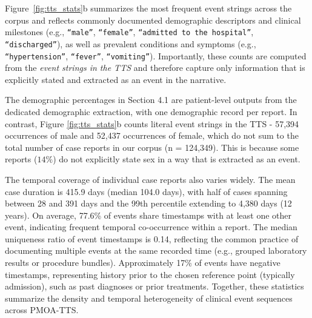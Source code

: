 \documentclass[pdflatex,sn-mathphys-num]{sn-jnl}%
\newif\ifshowrebuttalcolor
\newcommand{\rebuttal}[1]{%
  \ifshowrebuttalcolor
    \textcolor{rebuttalblue}{#1}%
  \else
    #1%
  \fi
}
\theoremstyle{thmstyleone}%
\theoremstyle{thmstyletwo}%
\theoremstyle{thmstylethree}%
\begin{document}
Figure~\ref{fig:tts_stats}b summarizes the most frequent event strings across the corpus and reflects commonly documented demographic descriptors and clinical milestones (e.g., \texttt{``male''}, \texttt{``female''}, \texttt{``admitted to the hospital''}, \texttt{``discharged''}), as well as prevalent conditions and symptoms (e.g., \texttt{``hypertension''}, \texttt{``fever''}, \texttt{``vomiting''}). 
Importantly, these counts are computed from the \emph{event strings in the TTS} and therefore capture only information that is explicitly stated and extracted as an event in the narrative. 
\rebuttal{The demographic percentages in Section 4.1 are patient-level outputs from the dedicated demographic extraction, with one demographic record per report. In contrast, Figure \ref{fig:tts_stats}b counts literal event strings in the TTS - 57,394 occurrences of male and 52,437 occurrences of female, which do not sum to the total number of case reports in our corpus (n = 124,349). This is because some reports ($14\%$) do not explicitly state sex in a way that is extracted as an event.}


The temporal coverage of individual case reports also varies widely. 
The mean case duration is 415.9 days (median 104.0 days), with half of cases spanning between 28 and 391 days and the 99th percentile extending to 4{,}380 days (12 years). 
On average, 77.6\% of events share timestamps with at least one other event, indicating frequent temporal co-occurrence within a report. 
The median uniqueness ratio of event timestamps is 0.14, reflecting the common practice of documenting multiple events at the same recorded time (e.g., grouped laboratory results or procedure bundles). 
Approximately 17\% of events have negative timestamps, representing history prior to the chosen reference point (typically admission), such as past diagnoses or prior treatments.
Together, these statistics summarize the density and temporal heterogeneity of clinical event sequences across PMOA-TTS. 
\end{document}
